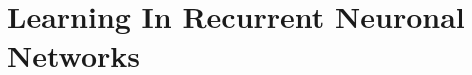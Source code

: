 \documentclass[main]{subfiles}
\begin{document}
\newpage
\section{Learning In Recurrent Neuronal Networks}
\end{document}
